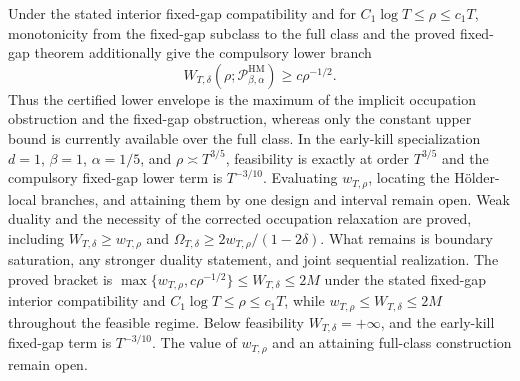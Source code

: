 Under the stated interior fixed-gap compatibility and for \(C_1\log T\le\rho\le c_1T\), monotonicity from the fixed-gap subclass to the full class and the proved fixed-gap theorem additionally give the compulsory lower branch
\[
W_{T,\delta}(\rho;\mathcal P_{\beta,\alpha}^{\mathrm{HM}})\ge c\rho^{-1/2}.
\]
Thus the certified lower envelope is the maximum of the implicit occupation obstruction and the fixed-gap obstruction, whereas only the constant upper bound is currently available over the full class.  In the early-kill specialization \(d=1\), \(\beta=1\), \(\alpha=1/5\), and \(\rho\asymp T^{3/5}\), feasibility is exactly at order \(T^{3/5}\) and the compulsory fixed-gap lower term is \(T^{-3/10}\).  Evaluating \(w_{T,\rho}\), locating the H\"older-local branches, and attaining them by one design and interval remain open.
Weak duality and the necessity of the corrected occupation relaxation are proved, including \(W_{T,\delta}\ge w_{T,\rho}\) and \(\Omega_{T,\delta}\ge2w_{T,\rho}/(1-2\delta)\).  What remains is boundary saturation, any stronger duality statement, and joint sequential realization.
The proved bracket is \(\max\{w_{T,\rho},c\rho^{-1/2}\}\le W_{T,\delta}\le2M\) under the stated fixed-gap interior compatibility and \(C_1\log T\le\rho\le c_1T\), while \(w_{T,\rho}\le W_{T,\delta}\le2M\) throughout the feasible regime.  Below feasibility \(W_{T,\delta}=+\infty\), and the early-kill fixed-gap term is \(T^{-3/10}\).  The value of \(w_{T,\rho}\) and an attaining full-class construction remain open.
